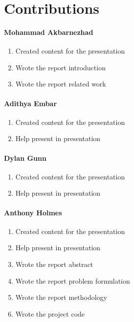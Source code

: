 \section{Contributions}

\paragraph{Mohammad Akbarnezhad}
\begin{enumerate}
    \item Created content for the presentation
    \item Wrote the report introduction
    \item Wrote the report related work
\end{enumerate}

\paragraph{Adithya Embar}
\begin{enumerate}
    \item Created content for the presentation
    \item Help present in presentation
\end{enumerate}

\paragraph{Dylan Gunn}
\begin{enumerate}
    \item Created content for the presentation
    \item Help present in presentation

\end{enumerate}

\paragraph{Anthony Holmes}
\begin{enumerate}
    \item Created content for the presentation
    \item Help present in presentation
    \item Wrote the report abstract
    \item Wrote the report problem formulation
    \item Wrote the report methodology
    \item Wrote the project code
    
\end{enumerate}
